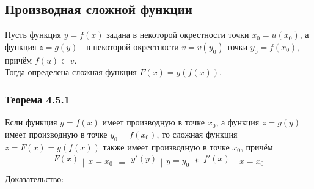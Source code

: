 \documentclass[12pt]{article}
\begin{document}
    \subsection{Производная сложной функции}
    Пусть функция $y = f(x)$ задана в некоторой окрестности точки $x_0 = u(x_0)$, а функция $z = g(y)$ - в некоторой окрестности $v = v(y_0)$ точки $y_0 = f(x_0)$, причём $f(u) \subset v$.\\
    Тогда определена сложная функция $F(x) = g(f(x))$.
    \subsubsection*{Теорема 4.5.1}\label{th:4.5.1}
    Если функция $y=f(x)$ имеет производную в точке $x_0$, а функция $z = g(y)$ имеет производную в точке $y_0 = f(x_0)$, то сложная функция $z = F(x) = g(f(x))$ также имеет производную в точке $x_0$, причём
    \[ \begin{matrix}F(x)\\\\\end{matrix}\Big|\begin{matrix}\\x = x_0\\\end{matrix} = \begin{matrix}y'(y)\\\\\end{matrix}\Big|\begin{matrix}\\y = y_0\\\end{matrix} * \begin{matrix}f'(x)\\\\\end{matrix}\Big|\begin{matrix}\\x = x_0\\\end{matrix} \]
    \underline{Доказательство:}
\end{document}
